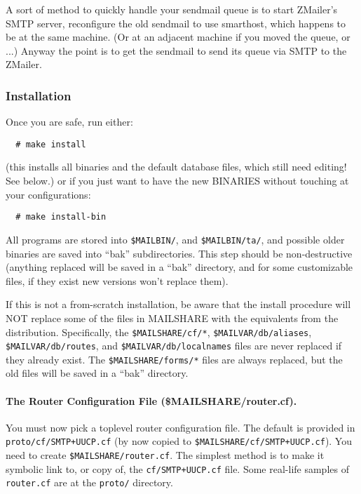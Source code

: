 A sort of method to quickly handle your sendmail queue is to
start ZMailer's SMTP server, reconfigure the old sendmail to
use smarthost, which happens to be at the same machine.
(Or at an adjacent machine if you moved the queue, or ...)
Anyway the point is to get the sendmail to send its queue
via SMTP to the ZMailer.


\subsubsection{Installation}

Once you are safe, run either:
\begin{verbatim}
  # make install
\end{verbatim}

(this installs all binaries and the default database files, which
still need editing! See below.)
or if you just want to have the new BINARIES without touching
at your configurations:
\begin{verbatim}
  # make install-bin
\end{verbatim}

All programs are stored into  {\tt \$MAILBIN/}, and {\tt \$MAILBIN/ta/}, and
possible older binaries are saved into ``bak'' subdirectories.
This step should be non-destructive (anything replaced will be
saved in a ``bak'' directory, and for some customizable files, if
they exist new versions won't replace them).

If this is not a from-scratch installation, be aware that the
install procedure will NOT replace some of the files in MAILSHARE
with the equivalents from the distribution.  Specifically, the
{\tt \$MAILSHARE/cf/*}, {\tt \$MAILVAR/db/aliases}, {\tt \$MAILVAR/db/routes}, and
{\tt \$MAILVAR/db/localnames} files are never replaced if they already
exist.  The {\tt \$MAILSHARE/forms/*} files are always replaced, but the
old files will be saved in a ``bak'' directory.


\paragraph{The Router Configuration File (\$MAILSHARE/router.cf).}%
%

You must now pick a toplevel router configuration file.  The
default is provided in {\tt proto/cf/SMTP+UUCP.cf} (by now copied to
{\tt \$MAILSHARE/cf/SMTP+UUCP.cf}). You need to create {\tt \$MAILSHARE/router.cf}.
The simplest method is to make it symbolic link to, or copy of,
the {\tt cf/SMTP+UUCP.cf} file.
Some real-life samples of {\tt router.cf} are at the {\tt proto/} directory.


